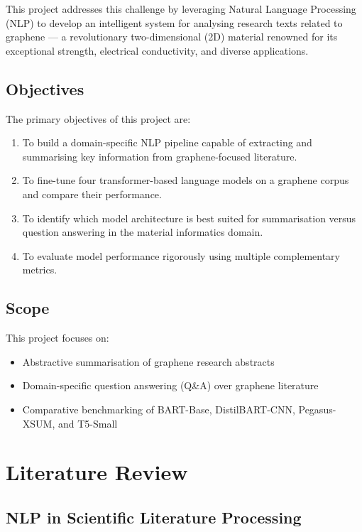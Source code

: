 \documentclass[12pt, a4paper]{report}
\begin{document}
This project addresses this challenge by leveraging Natural Language Processing (NLP) to develop an intelligent system for analysing research texts related to graphene --- a revolutionary two-dimensional (2D) material renowned for its exceptional strength, electrical conductivity, and diverse applications.

\section{Objectives}

The primary objectives of this project are:
\begin{enumerate}[leftmargin=*]
    \item To build a domain-specific NLP pipeline capable of extracting and summarising key information from graphene-focused literature.
    \item To fine-tune four transformer-based language models on a graphene corpus and compare their performance.
    \item To identify which model architecture is best suited for summarisation versus question answering in the material informatics domain.
    \item To evaluate model performance rigorously using multiple complementary metrics.
\end{enumerate}

\section{Scope}

This project focuses on:
\begin{itemize}[leftmargin=*]
    \item Abstractive summarisation of graphene research abstracts
    \item Domain-specific question answering (Q\&A) over graphene literature
    \item Comparative benchmarking of BART-Base, DistilBART-CNN, Pegasus-XSUM, and T5-Small
\end{itemize}

\chapter{Literature Review}

\section{NLP in Scientific Literature Processing}
\end{document}
